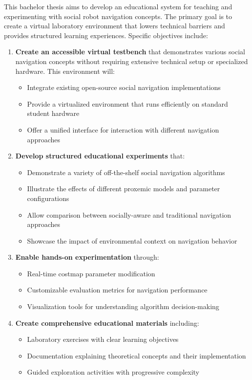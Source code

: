 This bachelor thesis aims to develop an educational system for teaching and experimenting 
with social robot navigation concepts. The primary goal is to create a virtual laboratory 
environment that lowers technical barriers and provides structured learning experiences. 
Specific objectives include:

\begin{enumerate}
    \item \textbf{Create an accessible virtual testbench} that demonstrates various social navigation concepts 
    without requiring extensive technical setup or specialized hardware. This environment will:
    \begin{itemize}
        \item Integrate existing open-source social navigation implementations
        \item Provide a virtualized environment that runs efficiently on standard student hardware
        \item Offer a unified interface for interaction with different navigation approaches
    \end{itemize}
    
    \item \textbf{Develop structured educational experiments} that:
    \begin{itemize}
        \item Demonstrate a variety of off-the-shelf social navigation algorithms
        \item Illustrate the effects of different proxemic models and parameter configurations
        \item Allow comparison between socially-aware and traditional navigation approaches
        \item Showcase the impact of environmental context on navigation behavior
    \end{itemize}
    
    \item \textbf{Enable hands-on experimentation} through:
    \begin{itemize}
        \item Real-time costmap parameter modification
        \item Customizable evaluation metrics for navigation performance
        \item Visualization tools for understanding algorithm decision-making
    \end{itemize}
    
    \item \textbf{Create comprehensive educational materials} including:
    \begin{itemize}
        \item Laboratory exercises with clear learning objectives
        \item Documentation explaining theoretical concepts and their implementation
        \item Guided exploration activities with progressive complexity
    \end{itemize}
\end{enumerate}


